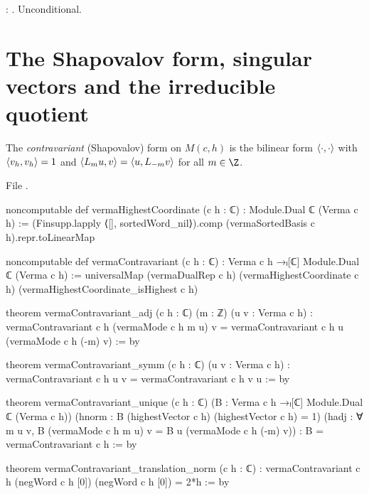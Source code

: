 \begin{status}
\allowbreak{}\allowbreak{}\allowbreak{}\allowbreak{}: \lean{[propext, Classical.}\allowbreak{}\allowbreak\lean{sound]}.
Unconditional.
\end{status}

\section{The Shapovalov form, singular vectors and the irreducible quotient}\label{l06:sec:shap}

\begin{definition}\label{l06:def:shap}
The \emph{contravariant} (Shapovalov) form on $M(c,h)$ is the bilinear form $\langle \cdot,\cdot\rangle$ with
$\langle v_h,v_h\rangle = 1$ and $\langle L_mu,v\rangle = \langle u,L_{-m}v\rangle$ for all $m\in\Z$.
\end{definition}

File .
\begin{leancode}
noncomputable def vermaHighestCoordinate (c h : ℂ) : Module.Dual ℂ (Verma c h) :=
  (Finsupp.lapply ⟨[], sortedWord_nil⟩).comp (vermaSortedBasis c h).repr.toLinearMap

noncomputable def vermaContravariant (c h : ℂ) :
    Verma c h →ₗ[ℂ] Module.Dual ℂ (Verma c h) :=
  universalMap (vermaDualRep c h) (vermaHighestCoordinate c h)
    (vermaHighestCoordinate_isHighest c h)

theorem vermaContravariant_adj (c h : ℂ) (m : ℤ) (u v : Verma c h) :
    vermaContravariant c h (vermaMode c h m u) v =
      vermaContravariant c h u (vermaMode c h (-m) v) := by

theorem vermaContravariant_symm (c h : ℂ) (u v : Verma c h) :
    vermaContravariant c h u v = vermaContravariant c h v u := by

theorem vermaContravariant_unique (c h : ℂ)
    (B : Verma c h →ₗ[ℂ] Module.Dual ℂ (Verma c h))
    (hnorm : B (highestVector c h) (highestVector c h) = 1)
    (hadj : ∀ m u v, B (vermaMode c h m u) v = B u (vermaMode c h (-m) v)) :
    B = vermaContravariant c h := by

theorem vermaContravariant_translation_norm (c h : ℂ) :
    vermaContravariant c h (negWord c h [0]) (negWord c h [0]) = 2*h := by
\end{leancode}

